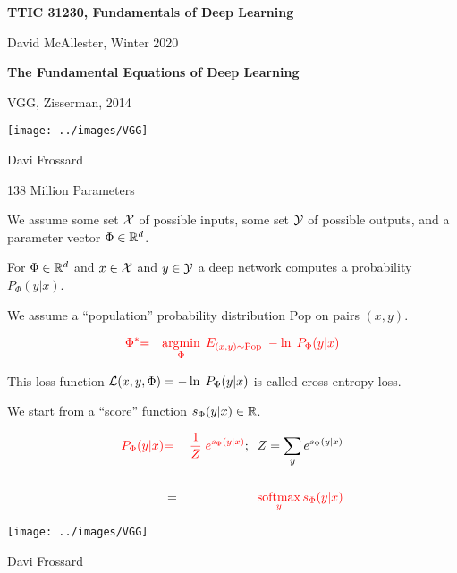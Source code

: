 




{\Huge
  \centerline{\bf TTIC 31230,  Fundamentals of Deep Learning}
  \vfill
  \centerline{David McAllester, Winter 2020}
  \vfill
  \centerline{\bf The Fundamental Equations of Deep Learning}

{VGG, Zisserman, 2014}

\centerline{\texttt{[image: ../images/VGG]}}
\centerline{\large Davi Frossard}

\vfill
\centerline{{\color{red} 138 Million Parameters}}


{\color{red} We assume some set ${\cal X}$ of possible inputs, some set ${\cal Y}$ of possible outputs,
and a parameter vector $\Phi \in \mathbb{R}^d$.}

\vfill
For $\Phi \in \mathbb{R}^d$ and $x \in {\cal X}$ and $y \in {\cal Y}$ a deep network computes a probability {\color{red} $P_\Phi(y|x)$}.


We assume a ``population'' probability distribution $\mathrm{Pop}$ on pairs $(x,y)$.

\vfill
\begin{eqnarray*}
{\color{red} \Phi^*} & {\color{red}  =} & {\color{red} \operatorname*{argmin}_\Phi \;E_{(x,y) \sim \mathrm{Pop}}\; -\ln \;P_\Phi(y|x)}
\end{eqnarray*}

\vfill
This loss function {\color{red} ${\cal L}(x,y,\Phi) = - \ln \;P_\Phi(y|x)$} is called {\color{red} cross entropy loss}.


We start from a ``score'' function $s_\Phi(y|x) \in \mathbb{R}$.

\vfill
\begin{eqnarray*}
  {\color{red} P_\Phi(y|x)} & {\color{red} =} & {\color{red} \frac{1}{Z}\;e^{s_\Phi(y|x)}};\;\; Z = \sum_y e^{s_\Phi(y|x)} \\
  \\
  & = & {\color{red} \operatorname*{softmax}_y s_\Phi(y|x)}
\end{eqnarray*}


\centerline{\texttt{[image: ../images/VGG]}}
\centerline{\large Davi Frossard}

}
